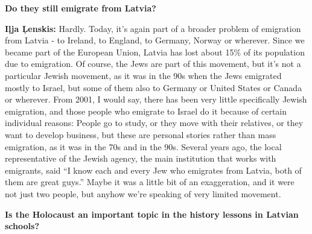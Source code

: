 \textbf{Do they still emigrate from Latvia?} 

\textbf{Iļja Ļenskis:} Hardly. Today, it’s again part of a broader problem of emigration from Latvia - to Ireland, to England, to Germany, Norway or wherever. Since we became part of the European Union, Latvia has lost about 15\% of its population due to emigration. Of course, the Jews are part of this movement, but it’s not a particular Jewish movement, as it was in the 90s when the Jews emigrated mostly to Israel, but some of them also to Germany or United States or Canada or wherever. From 2001, I would say, there has been very little specifically Jewish emigration, and those people who emigrate to Israel do it because of certain individual reasons: People go to study, or they move with their relatives, or they want to develop business, but these are personal stories rather than mass emigration, as it was in the 70s and in the 90s. Several years ago, the local representative of the Jewish agency, the main institution that works with emigrants, said ``I know each and every Jew who emigrates from Latvia, both of them are great guys.'' Maybe it was a little bit of an exaggeration, and it were not just two people, but anyhow we’re speaking of very limited movement. 

\textbf{Is the Holocaust an important topic in the history lessons in Latvian schools?} 

